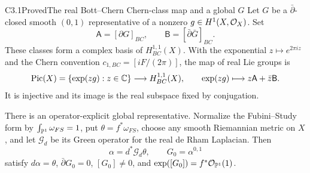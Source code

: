 \begin{claim}{C3.1}{Proved}{The real Bott--Chern Chern-class map and a global $G$}
Let $G$ be a $\bar\partial$-closed smooth $(0,1)$ representative of
a nonzero $g\in H^1(X,\mathcal O_X)$.  Set
\[
\mathsf A=[\partial G]_{BC},\qquad
\mathsf B=[\bar\partial\bar G]_{BC}.
\]
These classes form a complex basis of $H^{1,1}_{BC}(X)$.
With the exponential $z\mapsto e^{2\pi iz}$ and the Chern convention
$c_{1,BC}=[iF/(2\pi)]$, the map of real Lie groups is
\begin{equation}\label{eq:C-Pic-map}
\operatorname{Pic}(X)=\{\exp(zg):z\in\mathbb C\}\longrightarrow H^{1,1}_{BC}(X),
\qquad \exp(zg)\longmapsto z\mathsf A+\bar z\mathsf B.
\end{equation}
It is injective and its image is the real subspace fixed by conjugation.

There is an operator-explicit global representative.  Normalize the
Fubini--Study form by $\int_{\mathbb P^1}\omega_{FS}=1$, put
$\theta=f^*\omega_{FS}$, choose any smooth Riemannian metric on $X$,
and let $\mathcal G_d$ be its Green operator for the real de Rham
Laplacian.  Then
\begin{equation}\label{eq:C-G-Green}
\alpha=d^*\mathcal G_d\theta,\qquad G_0=\alpha^{0,1}
\end{equation}
satisfy $d\alpha=\theta$, $\bar\partial G_0=0$,
$[G_0]\ne0$, and $\exp([G_0])=f^*\mathcal O_{\mathbb P^1}(1)$.
\end{claim}
